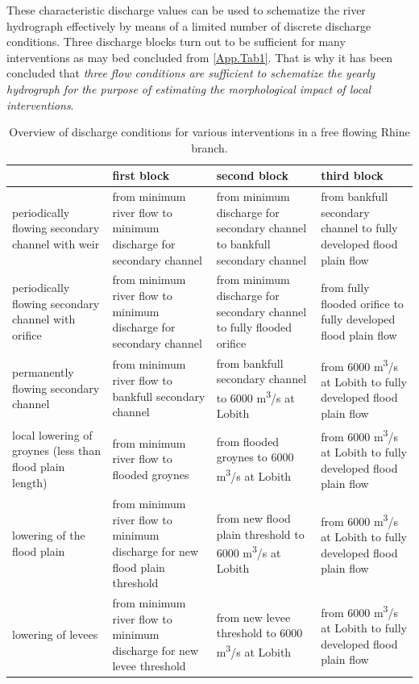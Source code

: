 These characteristic discharge values can be used to schematize the river hydrograph effectively by means of a limited number of discrete discharge conditions.
Three discharge blocks turn out to be sufficient for many interventions as may bed concluded from \autoref{App.Tab1}.
That is why it has been concluded that \emph{three flow conditions are sufficient to schematize the yearly hydrograph for the purpose of estimating the morphological impact of local interventions}.

\begin{table}
\small
\begin{tabular}{p{}|p{}|p{}|p{}}
 & first block & second block & third block \\ \hline
periodically flowing secondary channel with weir & from minimum river flow to minimum discharge for secondary channel & from minimum discharge for secondary channel to bankfull secondary channel & from bankfull secondary channel to fully developed flood plain flow \\ \hline
periodically flowing secondary channel with orifice & from minimum river flow to minimum discharge for secondary channel & from minimum discharge for secondary channel to fully flooded orifice & from fully flooded orifice to fully developed flood plain flow \\ \hline
permanently flowing secondary channel & from minimum river flow to bankfull secondary channel & from bankfull secondary channel to 6000 m\textsuperscript{3}/s at Lobith & from 6000 m\textsuperscript{3}/s at Lobith to fully developed flood plain flow \\ \hline
local lowering of groynes (less than flood plain length) & from minimum river flow to flooded groynes & from flooded groynes to 6000 m\textsuperscript{3}/s at Lobith & from 6000 m\textsuperscript{3}/s at Lobith to fully developed flood plain flow \\ \hline
lowering of the flood plain & from minimum river flow to minimum discharge for new flood plain threshold & from new flood plain threshold to 6000 m\textsuperscript{3}/s at Lobith & from 6000 m\textsuperscript{3}/s at Lobith to fully developed flood plain flow \\ \hline
lowering of levees & from minimum river flow to minimum discharge for new levee threshold & from new levee threshold to 6000 m\textsuperscript{3}/s at Lobith & from 6000 m\textsuperscript{3}/s at Lobith to fully developed flood plain flow \\
\end{tabular}

\caption{Overview of discharge conditions for various interventions in a free flowing Rhine branch.}
\label{App.Tab1}
\end{table}

